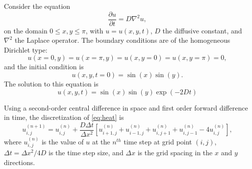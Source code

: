 \documentclass[11pt]{article}
\begin{document}
    Consider the equation
    \begin{equation}\label{eq:heat}
      \frac{\partial u}{\partial t} = D \nabla^2 u,
    \end{equation}
    on the domain \(0 \leq x,y \leq \pi\), with \(u = u(x,y,t)\), \(D\) the diffusive constant, and \(\nabla^2\) the Laplace operator.
    The boundary conditions are of the homogeneous Dirichlet type:
    \begin{equation}
      u(x = 0, y) = u(x = \pi, y) = u(x, y = 0) = u(x, y = \pi) = 0,
    \end{equation}
    and the initial condition is
    \begin{equation}
      u(x,y, t = 0) = \sin(x) \sin(y).
    \end{equation}
    The solution to this equation is
    \begin{equation}
      u(x,y,t) = \sin(x) \sin(y) \exp{(-2Dt)}
    \end{equation}
    
    Using a second-order central difference in space and first order forward difference in time, the discretization of \eqref{eq:heat} is
    \begin{equation}
      u_{i,j}^{\left(n+1\right)} = u_{i,j}^{\left(n\right)} + \frac{D \Delta t}{\Delta x^2} 
        \left[u_{i+1, j}^{\left(n\right)} +
              u_{i-1, j}^{\left(n\right)} +
              u_{i, j+1}^{\left(n\right)} +
              u_{i, j-1}^{\left(n\right)} -
              4u_{i, j}^{\left(n\right)} \right],
    \end{equation}
    where \(u_{i,j}^{\left(n\right)}\) is the value of \(u\) at the \(n^{th}\) time step at grid point \((i,j)\), \(\Delta t = \Delta x^2 / 4D\) is the time step size, and \(\Delta x\) is the grid spacing in the \(x\) and \(y\) directions.
    
    \vspace{5mm}
    
\end{document}
